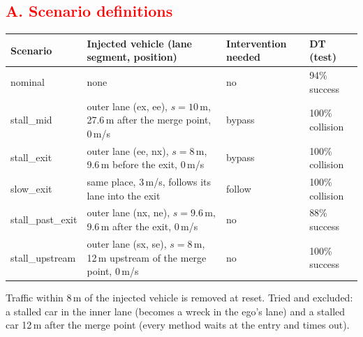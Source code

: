 \documentclass[11pt]{article}
\newcommand{\rev}[1]{\textcolor{red}{#1}}
\newenvironment{revblock}{\color{red}}{}
\begin{document}
\subsection*{\rev{A. Scenario definitions}}
\begin{revblock}
\begin{table}[h]
\centering\footnotesize
\begin{tabular}{l>{\raggedright\arraybackslash}p{7.2cm}ll}
\toprule
Scenario & Injected vehicle (lane segment, position) & Intervention needed & DT (test) \\
\midrule
nominal & none & no & 94\% success \\
stall\_mid & outer lane (ex, ee), $s=10$\,m, 27.6\,m after the merge point, 0\,m/s & bypass & 100\% collision \\
stall\_exit & outer lane (ee, nx), $s=8$\,m, 9.6\,m before the exit, 0\,m/s & bypass & 100\% collision \\
slow\_exit & same place, 3\,m/s, follows its lane into the exit & follow & 100\% collision \\
stall\_past\_exit & outer lane (nx, ne), $s=9.6$\,m, 9.6\,m after the exit, 0\,m/s & no & 88\% success \\
stall\_upstream & outer lane (sx, se), $s=8$\,m, 12\,m upstream of the merge point, 0\,m/s & no & 100\% success \\
\bottomrule
\end{tabular}
\end{table}
Traffic within 8\,m of the injected vehicle is removed at reset. Tried and excluded: a stalled car in the inner lane
(becomes a wreck in the ego's lane) and a stalled car 12\,m after the merge point (every method waits at the entry and
times out).
\end{revblock}
\end{document}
